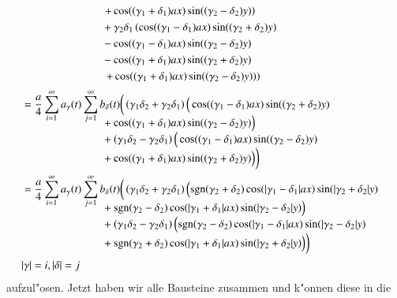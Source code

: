 \begin{align*}
\\[-1.0ex]
&\phantom{=abbb\sum\sum.....{}}
\left.
+\cos((\gamma_1 + \delta_1)ax)\sin((\gamma_2 - \delta_2)y)
\right)
\\[-1.0ex]
&\phantom{=abbb\sum\sum.....{}}
+
\gamma_2 \delta_1
\left(
\cos((\gamma_1 - \delta_1)ax)\sin((\gamma_2 + \delta_2)y)
\right.
\\[-1.0ex]
&\phantom{=abbb\sum\sum.....{}}
-\cos((\gamma_1 - \delta_1)ax)\sin((\gamma_2 - \delta_2)y)
\\[-1.0ex]
&\phantom{=abbb\sum\sum.....{}}
-\cos((\gamma_1 + \delta_1)ax)\sin((\gamma_2 + \delta_2)y)
\\[-1.0ex]
&\phantom{=abbb\sum\sum.....{}}
\left.
\left.
+\cos((\gamma_1 + \delta_1)ax)\sin((\gamma_2 - \delta_2)y)
\right)
\right)
\\
&=
\frac{a}{4}
\sum_{i = 1}^{\infty}
a_{\gamma}(t)
\sum_{j = 1}^{\infty}
b_{\delta}(t)
\bigg(
\left(\gamma_1 \delta_2 + \gamma_2 \delta_1 \right)
\Big(
\cos((\gamma_1 - \delta_1)ax)\sin((\gamma_2 + \delta_2)y)
\\[-2.5ex]
&\phantom{=abbb\sum\sum.....{}}
+
\cos((\gamma_1 + \delta_1)ax)\sin((\gamma_2 - \delta_2)y)
\Big)
\\[-1.0ex]
&\phantom{=abbb\sum\sum.....{}}
+
\left(\gamma_1 \delta_2 - \gamma_2 \delta_1 \right)
\Big(
\cos((\gamma_1 - \delta_1)ax)\sin((\gamma_2 - \delta_2)y)
\\[-1.0ex]
&\phantom{=abbb\sum\sum.....{}}
+
\cos((\gamma_1 + \delta_1)ax)\sin((\gamma_2 + \delta_2)y)
\Big)
\bigg)
\\
&=
\frac{a}{4}
\sum_{i = 1}^{\infty}
a_{\gamma}(t)
\sum_{j = 1}^{\infty}
b_{\delta}(t)
\bigg(
\left(\gamma_1 \delta_2 + \gamma_2 \delta_1 \right)
\Big(
\sgn(\gamma_2 + \delta_2)
\cos(|\gamma_1 - \delta_1|ax)\sin(|\gamma_2 + \delta_2|y)
\\[-2.5ex]
&\phantom{=abbb\sum\sum.....{}}
+
\sgn(\gamma_2 - \delta_2)
\cos(|\gamma_1 + \delta_1|ax)\sin(|\gamma_2 - \delta_2|y)
\Big)
\\[-1.0ex]
&\phantom{=abbb\sum\sum.....{}}
+
\left(\gamma_1 \delta_2 - \gamma_2 \delta_1 \right)
\Big(
\sgn(\gamma_2 - \delta_2)
\cos(|\gamma_1 - \delta_1|ax)\sin(|\gamma_2 - \delta_2|y)
\\[-1.0ex]
&\phantom{=abbb\sum\sum.....{}}
+
\sgn(\gamma_2 + \delta_2)
\cos(|\gamma_1 + \delta_1|ax)\sin(|\gamma_2 + \delta_2|y)
\Big)
\bigg)
\\
&|\gamma| = i, |\delta| = j
\end{align*}
aufzul"osen. Jetzt haben wir alle Bausteine zusammen und k"onnen diese in die 
